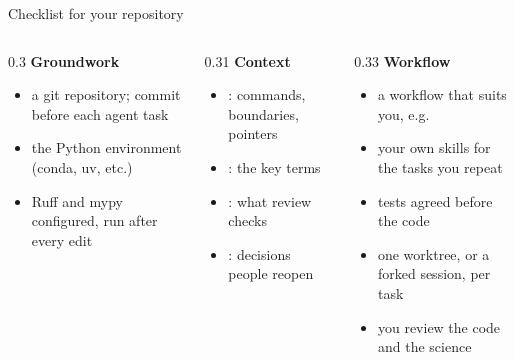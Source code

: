 \begin{frame}{Checklist for your repository}
  \setlength\leftmargini{5mm}
  \begin{columns}[T,onlytextwidth]
    \begin{column}{0.3\textwidth}
      \textbf{\color{udsdark}Groundwork}\par\vskip1mm
      \begin{itemize}\footnotesize\setlength\itemsep{2mm}
        \item a git repository; commit before each agent task
        \item the Python environment (conda, uv, etc.)
        \item Ruff and mypy configured, run after every edit
      \end{itemize}
    \end{column}
    \begin{column}{0.31\textwidth}
      \textbf{\color{udsblue}Context}\par\vskip1mm
      \begin{itemize}\footnotesize\setlength\itemsep{2mm}
        \item {}: commands, boundaries, pointers
        \item {}: the key terms
        \item {}: what review checks
        \item {}: decisions people reopen
      \end{itemize}
    \end{column}
    \begin{column}{0.33\textwidth}
      \textbf{\color{udsred}Workflow}\par\vskip1mm
      \begin{itemize}\footnotesize\setlength\itemsep{2mm}
        \item a workflow that suits you, e.g.\
          \href{https://github.com/mattpocock/skills}{\faGithub\enspace\underline{}}
        \item your own skills for the tasks you repeat
        \item tests agreed before the code
        \item one worktree, or a forked session, per task
        \item you review the code and the science

\end{itemize}
\end{column}
\end{columns}
\end{frame}
